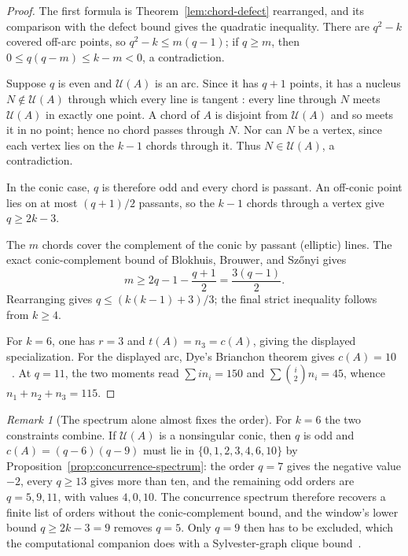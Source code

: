 \documentclass[11pt]{article}
\theoremstyle{definition}
\theoremstyle{remark}
\newtheorem{remark}[theorem]{Remark}
\newcommand{\cU}{\mathcal{U}}
\begin{document}
\begin{proof}
The first formula is Theorem~\ref{lem:chord-defect} rearranged, and its
comparison with the defect bound gives the quadratic inequality. There are
$q^2-k$ covered off-arc points, so $q^2-k\le m(q-1)$; if $q\ge m$, then
$0\le q(q-m)\le k-m<0$, a contradiction.

Suppose $q$ is even and $\cU(A)$ is an arc. Since it has $q+1$ points, it
has a nucleus $N\notin\cU(A)$ through which every line is tangent
\cite[p.~177]{Hirschfeld1998}: every line through $N$ meets $\cU(A)$ in
exactly one point.  A chord of $A$ is disjoint from $\cU(A)$ and so meets
it in no point; hence no chord passes through $N$.  Nor can $N$ be a
vertex, since each vertex lies on the $k-1$ chords through it.  Thus
$N\in\cU(A)$, a contradiction.

In the conic case, $q$ is therefore odd and every chord is passant. An
off-conic point lies on at most $(q+1)/2$ passants, so the $k-1$ chords
through a vertex give $q\ge2k-3$.

The $m$ chords cover the complement of the conic by passant (elliptic)
lines.  The exact conic-complement bound of Blokhuis, Brouwer, and
Sz\H{o}nyi gives~\cite[Proposition~1.6]{BBS2010}
\[
 m\ge 2q-1-\frac{q+1}{2}=\frac{3(q-1)}2.
\]
Rearranging gives $q\le(k(k-1)+3)/3$; the final strict inequality follows
from $k\ge4$.

For $k=6$, one has $r=3$ and $t(A)=n_3=c(A)$, giving the displayed
specialization. For the displayed arc, Dye's Brianchon theorem gives
$c(A)=10$~\cite[Theorem~1, pp.~275--276]{Dye1991}. At $q=11$, the two
moments read $\sum i n_i=150$ and $\sum\binom{i}{2}n_i=45$, whence
$n_1+n_2+n_3=115$.
\end{proof}

\begin{remark}[The spectrum alone almost fixes the order]
\label{rem:spectrum-field-restriction}
For $k=6$ the two constraints combine.  If $\cU(A)$ is a nonsingular conic,
then $q$ is odd and $c(A)=(q-6)(q-9)$ must lie in
$\{0,1,2,3,4,6,10\}$ by Proposition~\ref{prop:concurrence-spectrum}: the
order $q=7$ gives the negative value $-2$, every $q\ge13$ gives more than
ten, and the remaining odd orders are $q=5,9,11$, with values $4,0,10$.
The concurrence spectrum therefore recovers a finite list of orders without
the conic-complement bound, and the window's lower bound $q\ge2k-3=9$
removes $q=5$.  Only $q=9$ then has to be excluded, which the computational
companion does with a Sylvester-graph clique
bound~\cite{RuddComputational2026}.
\end{remark}
\end{document}
